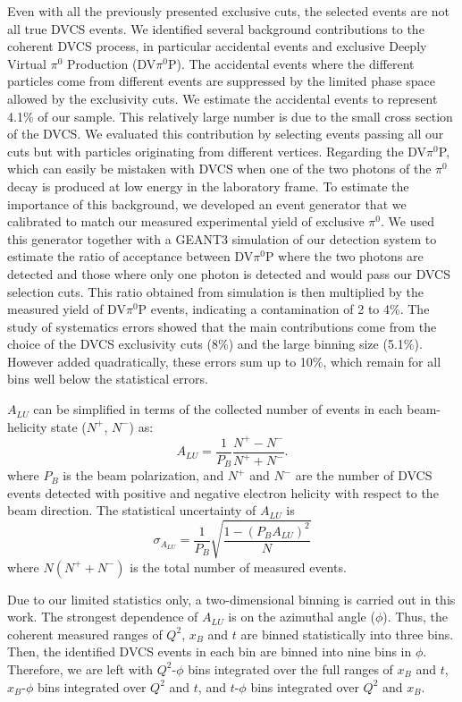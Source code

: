 \documentclass[nofootinbib,twocolumn,showpacs,prl,superscriptaddress,secnumarabic,amssymb,nobibnotes,aps,floatfix]{revtex4}
\begin{document}
Even with all the previously presented exclusive cuts, the selected events are
not all true DVCS events. We identified several background contributions to the 
coherent DVCS process, in particular accidental events and exclusive Deeply 
Virtual $\pi^0$ Production (DV$\pi^0$P). The accidental events where the 
different particles come from different events are suppressed by the limited 
phase space allowed by the exclusivity cuts. We estimate the accidental events 
to represent 4.1\% of our sample. This relatively large number is due to the 
small cross section of the DVCS. We evaluated this contribution by selecting 
events passing all our cuts but with particles originating from different 
vertices. Regarding the DV$\pi^0$P, which can easily be mistaken with DVCS when 
one of the two photons of the $\pi^0$ decay is produced at low energy in the 
laboratory frame. To estimate the importance of this background, we developed 
an event generator that we calibrated to match our measured experimental yield 
of exclusive $\pi^0$. We used this generator together with a GEANT3 simulation 
of our detection system to estimate the ratio of acceptance between DV$\pi^0$P 
where the two photons are detected and those where only one photon is detected 
and would pass our DVCS selection cuts. This ratio obtained from simulation is 
then multiplied by the measured yield of DV$\pi^0$P events, indicating a 
contamination of 2 to 4\%. The study of systematics errors showed that the main 
contributions come from the choice of the DVCS exclusivity cuts (8\%) and the 
large binning size (5.1\%). However added quadratically, these errors sum up to 
10\%, which remain for all bins well below the statistical errors.

$A_{LU}$ can be simplified in terms of the collected number of events in each 
beam-helicity state ($N^{+}$, $N^{-}$) as:
\begin{equation}
A_{LU} = \frac{1}{P_{B}} \frac{N^{+} - N^{-}}{N^{+} + N^{-} }.
\end{equation}
where $P_{B}$ is the beam polarization, and $N^{+}$ and $N^{-}$ are the number 
of DVCS events detected with positive and negative electron helicity with 
respect to the beam direction. The statistical uncertainty of $A_{LU}$ is
\begin{equation}
   \sigma_{A_{LU}} = \frac{1}{P_{B}} \sqrt{ \frac{1 - (P_{B}A_{LU})^{2}}{N}}
\end{equation}
where $N (N^{+} + N^{-}) $ is the total number of measured events.

Due to our limited statistics only, a two-dimensional binning is carried out in 
this work. The strongest dependence of $A_{LU}$ is on the azimuthal angle 
($\phi$). Thus, the coherent measured ranges of $Q^{2}$, $x_{B}$ and $t$ are 
binned statistically into three bins. Then, the identified DVCS events in each 
bin are binned into nine bins in $\phi$. Therefore, we are left
with $Q^{2}$-$\phi$ bins integrated over the full ranges of $x_{B}$ and $t$, 
$x_{B}$-$\phi$ bins integrated over $Q^{2}$ and $t$, and $t$-$\phi$ bins 
integrated over $Q^{2}$ and $x_{B}$.
\end{document}
